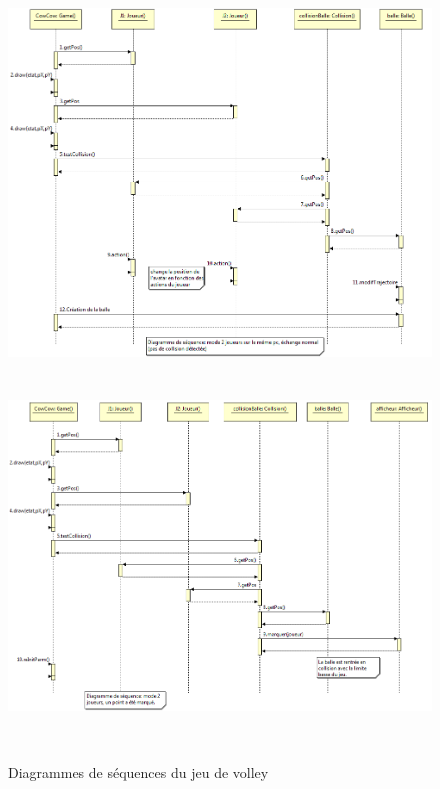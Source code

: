 \begin{figure}[h]
 \centering
 \includegraphics[height=9.5cm]{../umls/UML_images/Volley/sequence} \hfill
 \includegraphics[height=10cm]{../umls/UML_images/Volley/sequence2} \hfill
 \caption{Diagrammes de séquences du jeu de volley}
\end{figure}


\clearpage

